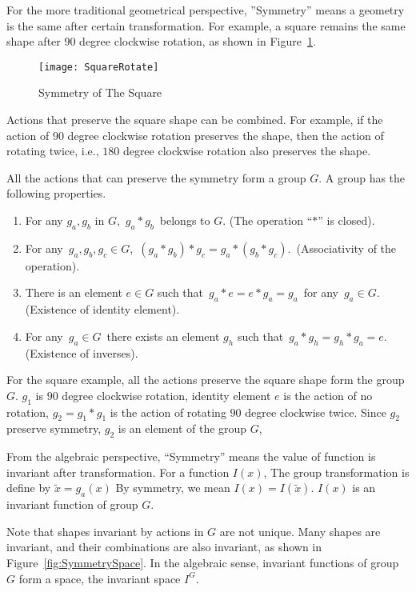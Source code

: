 For the more traditional geometrical perspective, ''Symmetry''  means a geometry is the same after certain transformation.
For example, a square remains the same shape after  $90$ degree clockwise rotation, as shown in Figure~\ref{fig:symsquare}.
\begin{figure}[!htbp]
  	\begin{center}
   	\texttt{[image: SquareRotate]}
	\end{center}
	\caption{Symmetry of The Square}
    \label{fig:symsquare}
\end{figure}

Actions that preserve the square shape can be combined.
For example, if the action of $90$ degree clockwise rotation preserves the shape, then the action of rotating twice, i.e., $180$ degree clockwise rotation also preserves the shape.

All the actions that can preserve the symmetry form a group $G$.
A group has the following properties.
\begin{enumerate}
\item For any $g_a,g_b$ in $G$, \,$g_a*g_b$\, belongs to $G$. (The operation ``$*$'' is closed).

\item For any \,$g_a,g_b,g_c\in G$, \,$(g_a*g_b)*g_c=g_a*(g_b*g_c)$. \,(Associativity of the operation).

\item There is an element $e\in G$ such that \,$g_a*e=e*g_a=g_a$\, for any \,$g_a\in G$. (Existence of identity element).

\item For any \,$g_a\in G$\, there exists an element $g_h$ such that \,$g_a*g_h=g_h*g_a=e$. \,(Existence of inverses).
\end{enumerate}

For the square example, all the actions preserve the square shape form the group $G$.
$g_1$ is  $90$ degree clockwise rotation, identity element $e$ is the action of no rotation,
$g_2=g_1*g_1$ is the action of rotating $90$ degree clockwise twice.
Since $g_2$ preserve symmetry, $g_2$ is an element of the group $G$, 


From the algebraic perspective, ``Symmetry'' means the value of function is invariant after transformation.
For a function $I(x)$,
The group transformation is define by $\tilde{x}=g_a(x)$
By symmetry, we mean $I(x)=I(\tilde{x})$.
$I(x)$ is an invariant function of group $G$.


Note that  shapes invariant by actions in $G$  are not unique.
Many shapes are invariant, and their combinations are also invariant, as shown in Figure~\ref{fig:SymmetrySpace}. 
In the algebraic sense,  invariant functions of group $G$ form a space, the invariant space $I^G$.


